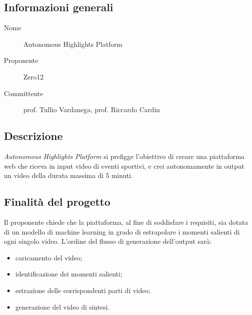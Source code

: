 \documentclass[../studio-di-fattibilita.tex]{subfiles}
\begin{document}
\subsection{Informazioni generali}%
\label{subsec:informazioni_generali}
\begin{description}
  \item[Nome] Autonomous Highlights Platform
  \item[Proponente] Zero12
  \item[Committente] prof. Tullio Vardanega, prof. Riccardo Cardin
\end{description}


\subsection{Descrizione}%
\label{subsec:Descrizione}
\textit{Autonomous Highlights Platform} si prefigge l'obiettivo di creare una piattaforma web che riceva in input video di eventi sportivi, e crei autonomamente in output un video della durata massima di 5 minuti.


\subsection{Finalità del progetto}%
\label{subsec:finalita_del_progetto}
Il proponente chiede che la piattaforma, al fine di soddisfare i requisiti, sia dotata di un modello di machine learning in grado di estrapolare i momenti salienti di ogni singolo video. L'ordine del flusso di generazione dell'output sarà:
\begin{itemize}
  \item caricamento del video;
  \item identificazione dei momenti salienti;
  \item estrazione delle corrispondenti parti di video;
  \item generazione del video di sintesi.
\end{itemize}
\end{document}
